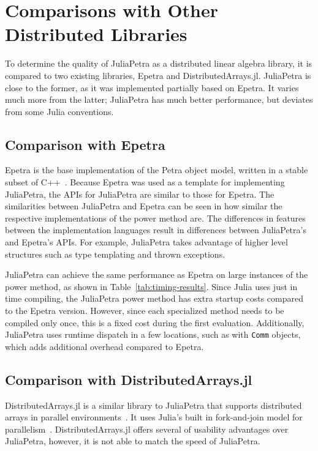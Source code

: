 \documentclass[acmsmall]{acmart}
\newcommand{\snippet}[1]{\lstinline{#1}}
\begin{document}
	\section{Comparisons with Other Distributed Libraries}
	
	To determine the quality of JuliaPetra as a distributed linear algebra library, it is compared to two existing libraries, Epetra and DistributedArrays.jl.
	JuliaPetra is close to the former, as it was implemented partially based on Epetra.
	It varies much more from the latter; JuliaPetra has much better performance, but deviates from some Julia conventions.
	
	\subsection{Comparison with Epetra}
	
	Epetra is the base implementation of the Petra object model,
	written in a stable subset of C++~\cite{Heroux:2005:Trilinos}.
	Because Epetra was used as a template for implementing JuliaPetra,
	the APIs for JuliaPetra are similar to those for Epetra.
	The similarities between JuliaPetra and Epetra can be seen in how similar the respective implementations
	of the power method are.
	The differences in features between the implementation languages result in differences
	between JuliaPetra's and Epetra's APIs.
	For example, JuliaPetra takes advantage of higher level structures
	such as type templating and thrown exceptions.
	
	JuliaPetra can achieve the same performance as Epetra on large instances of the power method, as shown in Table~\ref{tab:timing-results}.
	Since Julia uses just in time compiling, the JuliaPetra power method has extra startup costs compared to
	the Epetra version. However, since each specialized method needs to be compiled only once,
	this is a fixed cost during the first evaluation.
	Additionally, JuliaPetra uses runtime dispatch in a few locations, such as with
	\snippet{Comm} objects, which adds additional overhead compared to Epetra.
	
	\subsection{Comparison with DistributedArrays.jl}
	
	DistributedArrays.jl is a similar library to JuliaPetra that supports
	distributed arrays in parallel environments~\cite{Github:DA}.
	It uses Julia's built in fork-and-join model for parallelism~\cite{Bezanson:2017:FreshApproach}.
	DistributedArrays.jl offers several of usability advantages over JuliaPetra, however, it is not able to match the speed of JuliaPetra.
	
\end{document}
